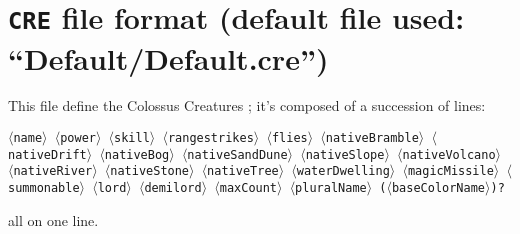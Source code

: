 \documentclass{article}
\begin{document}
\section{\texttt{CRE} file format (default file used: ``Default/Default.cre'')}
\label{CRE}

This file define the Colossus Creatures ; it's composed of a succession of lines:

\texttt{$\langle$name$\rangle$ $\langle$power$\rangle$ $\langle$skill$\rangle$
$\langle$rangestrikes$\rangle$ $\langle$flies$\rangle$
$\langle$nativeBramble$\rangle$ $\langle$nativeDrift$\rangle$
$\langle$nativeBog$\rangle$     $\langle$nativeSandDune$\rangle$
$\langle$nativeSlope$\rangle$   $\langle$nativeVolcano$\rangle$
$\langle$nativeRiver$\rangle$   $\langle$nativeStone$\rangle$
$\langle$nativeTree$\rangle$
$\langle$waterDwelling$\rangle$ $\langle$magicMissile$\rangle$
$\langle$summonable$\rangle$
$\langle$lord$\rangle$ $\langle$demilord$\rangle$
$\langle$maxCount$\rangle$
$\langle$pluralName$\rangle$
($\langle$baseColorName$\rangle$)?}

all on one line.
\end{document}
